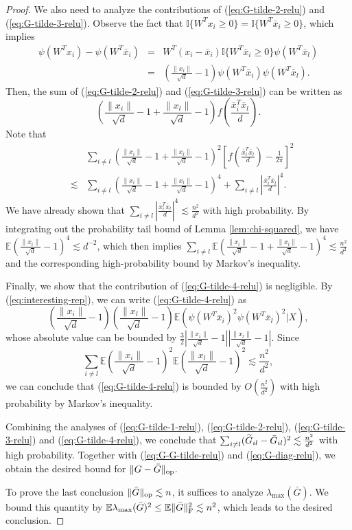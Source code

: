 \begin{proof}
We also need to analyze the contributions of (\ref{eq:G-tilde-2-relu}) and (\ref{eq:G-tilde-3-relu}). Observe the fact that $\mathbb{I}\{W^Tx_i\geq 0\}=\mathbb{I}\{W^T\bar{x}_i\geq 0\}$, which implies
\begin{eqnarray}
\nonumber \psi(W^Tx_i)-\psi(W^T\bar{x}_i) &=& W^T(x_i-\bar{x}_i)\mathbb{I}\{W^T\bar{x}_i\geq 0\}\psi(W^T\bar{x}_l) \\
\label{eq:interesting-rep} &=& \left(\frac{\|x_i\|}{\sqrt{d}}-1\right)\psi(W^T\bar{x}_i)\psi(W^T\bar{x}_l).
\end{eqnarray}
Then, the sum of (\ref{eq:G-tilde-2-relu}) and (\ref{eq:G-tilde-3-relu}) can be written as
$$\left(\frac{\|x_i\|}{\sqrt{d}}-1+\frac{\|x_l\|}{\sqrt{d}}-1\right)f\left(\frac{\bar{x}_i^T\bar{x}_l}{d}\right).$$
Note that
\begin{eqnarray*}
&& \sum_{i\neq l} \left(\frac{\|x_i\|}{\sqrt{d}}-1+\frac{\|x_l\|}{\sqrt{d}}-1\right)^2\left[f\left(\frac{\bar{x}_i^T\bar{x}_l}{d}\right)-\frac{1}{2\pi}\right]^2 \\
&\lesssim& \sum_{i\neq l} \left(\frac{\|x_i\|}{\sqrt{d}}-1+\frac{\|x_l\|}{\sqrt{d}}-1\right)^4 + \sum_{i\neq l}\left|\frac{\bar{x}_i^T\bar{x}_l}{d}\right|^4.
\end{eqnarray*}
We have already shown that $\sum_{i\neq l}\left|\frac{\bar{x}_i^T\bar{x}_l}{d}\right|^4\lesssim \frac{n^2}{d^2}$ with high probability. By integrating out the probability tail bound of Lemma \ref{lem:chi-squared}, we have $\mathbb{E}\left(\frac{\|x_i\|}{\sqrt{d}}-1\right)^4\lesssim d^{-2}$, which then implies $\sum_{i\neq l} \mathbb{E}\left(\frac{\|x_i\|}{\sqrt{d}}-1+\frac{\|x_l\|}{\sqrt{d}}-1\right)^4\lesssim \frac{n^2}{d^2}$ and the corresponding high-probability bound by Markov's inequality.

Finally, we show that the contribution of (\ref{eq:G-tilde-4-relu}) is negligible. By (\ref{eq:interesting-rep}), we can write (\ref{eq:G-tilde-4-relu}) as
$$\left(\frac{\|x_i\|}{\sqrt{d}}-1\right)\left(\frac{\|x_l\|}{\sqrt{d}}-1\right)\mathbb{E}\left(\psi(W^T\bar{x}_i)^2\psi(W^T\bar{x}_l)^2\Big|X\right),$$
whose absolute value can be bounded by $\frac{3}{2}\left|\frac{\|x_i\|}{\sqrt{d}}-1\right|\left|\frac{\|x_l\|}{\sqrt{d}}-1\right|$. Since
$$\sum_{i\neq l}\mathbb{E}\left(\frac{\|x_i\|}{\sqrt{d}}-1\right)^2\mathbb{E}\left(\frac{\|x_l\|}{\sqrt{d}}-1\right)^2\lesssim \frac{n^2}{d^2},$$
we can conclude that (\ref{eq:G-tilde-4-relu}) is bounded by $O\left(\frac{n^2}{d^2}\right)$ with high probability by Markov's inequality.

Combining the analyses of (\ref{eq:G-tilde-1-relu}), (\ref{eq:G-tilde-2-relu}), (\ref{eq:G-tilde-3-relu}) and (\ref{eq:G-tilde-4-relu}), we conclude that $\sum_{i\neq l}(\widetilde{G}_{il}-\bar{G}_{il})^2\lesssim \frac{n^2}{d^2}$ with high probability. Together with (\ref{eq:G-G-tilde-relu}) and (\ref{eq:G-diag-relu}), we obtain the desired bound for $\|G-\bar{G}\|_{\rm op}$.

To prove the last conclusion $\|\bar{G}\|_{\rm op}\lesssim n$, it suffices to analyze $\lambda_{\max}(\bar{G})$. We bound this quantity by $\mathbb{E}\lambda_{\max}(\bar{G})^2\leq \mathbb{E}\|\bar{G}\|_{\rm F}^2\lesssim n^2$, which leads to the desired conclusion.
\end{proof}


